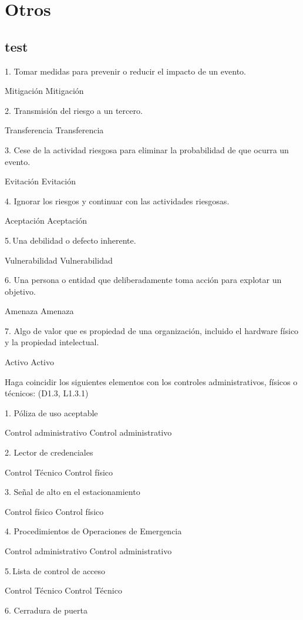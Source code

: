 \section{Otros}
 \subsection{test}
 1. Tomar medidas para prevenir o reducir el impacto de un evento.


Mitigación
   Mitigación

2. Transmisión del riesgo a un tercero.


Transferencia
   Transferencia

3. Cese de la actividad riesgosa para eliminar la probabilidad de que ocurra un evento.


Evitación
   Evitación

4. Ignorar los riesgos y continuar con las actividades riesgosas.


Aceptación
   Aceptación

5. Una debilidad o defecto inherente.


Vulnerabilidad
   Vulnerabilidad

6. Una persona o entidad que deliberadamente toma acción para explotar un objetivo.


Amenaza
   Amenaza

7. Algo de valor que es propiedad de una organización, incluido el hardware físico y la propiedad intelectual.


Activo
   Activo



Haga coincidir los siguientes elementos con los controles administrativos, físicos o técnicos: (D1.3, L1.3.1)

1. Póliza de uso aceptable


Control administrativo
   Control administrativo

2. Lector de credenciales


Control Técnico
   Control físico

3. Señal de alto en el estacionamiento


Control físico
   Control físico

4. Procedimientos de Operaciones de Emergencia


Control administrativo
   Control administrativo

5. Lista de control de acceso


Control Técnico
   Control Técnico

6. Cerradura de puerta



